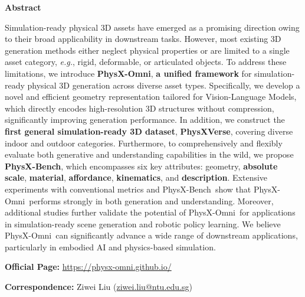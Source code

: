 \documentclass[11pt]{article}
\def\ourname{PhysX-Omni}
\def\ournewdata{PhysXVerse}
\def\ourbench{PhysX-Bench}
\newcommand{\officialpage}{
\href{https://physx-omni.github.io/}{https://physx-omni.github.io/}
}
\begin{document}
\begin{tcolorbox}[
    breakable,
    enhanced,
    colback=white,
    colframe=seedblue,
    arc=3pt,
    boxrule=0.6pt,
    left=12pt,
    right=12pt,
    top=10pt,
    bottom=10pt
]
\begin{center}
    {\large\bfseries\color{seedblue} Abstract}
\end{center}




Simulation-ready physical 3D assets have emerged as a promising direction owing to their broad applicability in downstream tasks. However, most existing 3D generation methods either neglect physical properties or are limited to a single asset category, \textit{e.g.}, rigid, deformable, or articulated objects. To address these limitations, we introduce \textbf{\ourname}, \textbf{a unified framework} for simulation-ready physical 3D generation across diverse asset types.
Specifically, we develop a novel and efficient geometry representation tailored for Vision-Language Models, which directly encodes high-resolution 3D structures without compression, significantly improving generation performance. In addition, we construct the \textbf{first general simulation-ready 3D dataset}, \textbf{\ournewdata}, covering diverse indoor and outdoor categories. Furthermore, to comprehensively and flexibly evaluate both generative and understanding capabilities in the wild, we propose \textbf{\ourbench}, which encompasses six key attributes: geometry, \textbf{\textcolor{color2}{absolute scale}}, \textbf{\textcolor{color3}{material}}, \textbf{\textcolor{color1}{affordance}}, \textbf{\textcolor{color4}{kinematics}}, and \textbf{\textcolor{color5}{description}}.
Extensive experiments with conventional metrics and \ourbench\ show that \ourname\ performs strongly in both generation and understanding. Moreover, additional studies further validate the potential of \ourname\ for applications in simulation-ready scene generation and robotic policy learning. We believe \ourname\ can significantly advance a wide range of downstream applications, particularly in embodied AI and physics-based simulation.

\vspace{0.5em}
\noindent\textbf{Official Page:} \officialpage

\noindent\textbf{Correspondence:} Ziwei Liu (\href{mailto:author@email.com}{ziwei.liu@ntu.edu.sg})
\end{tcolorbox}
\end{document}
